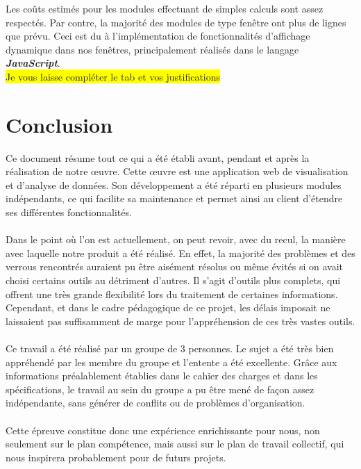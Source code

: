 	Les coûts estimés pour les modules effectuant de simples calculs sont assez respectés. Par contre, la majorité des modules de type fenêtre ont plus de lignes que prévu. Ceci est du à l'implémentation de fonctionnalités d'affichage dynamique dans nos fenêtres, principalement réalisés dans le langage \textit{\textbf{JavaScript}}.\\
	\colorbox{yellow}{Je vous laisse compléter le tab et vos justifications}
	
	
	\section*{Conclusion}
	Ce document résume tout ce qui a été établi avant, pendant et après la réalisation de notre œuvre. Cette œuvre est une application web de visualisation et d'analyse de données. Son développement a été réparti en plusieurs modules indépendants, ce qui facilite sa maintenance et permet ainsi au client d'étendre ses différentes fonctionnalités.
	\paragraph{} Dans le point où l'on est actuellement, on peut revoir, avec du recul, la manière avec laquelle notre produit a été réalisé. En effet, la majorité des problèmes et des verrous rencontrés auraient pu être aisément résolus ou même évités si on avait choisi certains outils au détriment d'autres. Il s'agit d'outils plus complets, qui offrent une très grande flexibilité lors du traitement de certaines informations. Cependant, et dans le cadre pédagogique de ce projet, les délais imposait ne laissaient pas suffisamment de marge pour l'appréhension de ces très vastes outils.
	\paragraph{} Ce travail a été réalisé par un groupe de 3 personnes. Le sujet a été très bien appréhendé par les membre du groupe et l'entente a été excellente. Grâce aux informations préalablement établies dans le cahier des charges et dans les spécifications, le travail au sein du groupe a pu être mené de façon assez indépendante, sans générer de conflits ou de problèmes d'organisation.
	\paragraph{} Cette épreuve constitue donc une expérience enrichissante pour nous, non seulement sur le plan compétence, mais aussi sur le plan de travail collectif, qui nous inspirera probablement pour de futurs projets.
		

